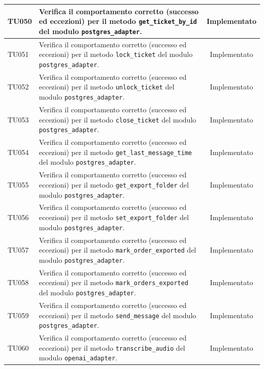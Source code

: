 \documentclass[a4paper,11pt,oneside]{scrartcl}
\begin{document}
\begin{longtable}{|p{1.9cm}|p{11.6cm}|c|}
    TU050           & Verifica il comportamento corretto (successo ed eccezioni) per il metodo \texttt{get\_ticket\_by\_id} del modulo \texttt{postgres\_adapter}.                 & Implementato   \\ \hline
    TU051           & Verifica il comportamento corretto (successo ed eccezioni) per il metodo \texttt{lock\_ticket} del modulo \texttt{postgres\_adapter}.                        & Implementato   \\ \hline
    TU052           & Verifica il comportamento corretto (successo ed eccezioni) per il metodo \texttt{unlock\_ticket} del modulo \texttt{postgres\_adapter}.                      & Implementato   \\ \hline
    TU053           & Verifica il comportamento corretto (successo ed eccezioni) per il metodo \texttt{close\_ticket} del modulo \texttt{postgres\_adapter}.                       & Implementato   \\ \hline
    TU054           & Verifica il comportamento corretto (successo ed eccezioni) per il metodo \texttt{get\_last\_message\_time} del modulo \texttt{postgres\_adapter}.            & Implementato   \\ \hline
    TU055           & Verifica il comportamento corretto (successo ed eccezioni) per il metodo \texttt{get\_export\_folder} del modulo \texttt{postgres\_adapter}.                 & Implementato   \\ \hline
    TU056           & Verifica il comportamento corretto (successo ed eccezioni) per il metodo \texttt{set\_export\_folder} del modulo \texttt{postgres\_adapter}.                 & Implementato   \\ \hline
    TU057           & Verifica il comportamento corretto (successo ed eccezioni) per il metodo \texttt{mark\_order\_exported} del modulo \texttt{postgres\_adapter}.               & Implementato   \\ \hline
    TU058           & Verifica il comportamento corretto (successo ed eccezioni) per il metodo \texttt{mark\_orders\_exported} del modulo \texttt{postgres\_adapter}.              & Implementato   \\ \hline
    TU059           & Verifica il comportamento corretto (successo ed eccezioni) per il metodo \texttt{send\_message} del modulo \texttt{postgres\_adapter}.                       & Implementato   \\ \hline
    TU060           & Verifica il comportamento corretto (successo ed eccezioni) per il metodo \texttt{transcribe\_audio} del modulo \texttt{openai\_adapter}.                     & Implementato   \\ \hline

\end{longtable}
\end{document}
